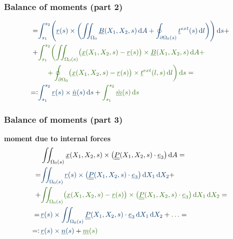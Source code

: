 \begin{frame}
  \frametitle{Balance of moments (part 2)}
  \begin{displaymath}
    \begin{alignedat}{1}
      = &{\color{faublue} \int_{s_1}^{s_2} \Biggl( \underline{r}(s) \times \biggl( \iint_{\Omega_0} \underline{B}(X_1,X_2,s) \dif A + \oint_{\partial \Omega_{0}(s)} \underline{t}^{ext}(s) \dif l \biggr) \Biggr) \dif s} + \\
        + &{\color{og_dark_green} \int_{s_1}^{s_2} \biggl( \iint_{\Omega_{0}(s)} \bigl( \underline{x}(X_1,X_2,s) - \underline{r}(s) \bigr) \times \underline{B}(X_1,X_2,s) \dif A + } \\
        &{\color{og_dark_green} \quad \: \, + \oint_{\partial \Omega_0} \bigl( \underline{x}(X_1,X_2,s) - \underline{r}(s) \bigr) \times \underline{t}^{ext}(l,s) \dif l \biggr) \dif s } = \\
      =: &{\color{faublue} \int_{s_1}^{s_2} \underline{r}(s) \times \underline{\hat{n}}(s) \dif s} +
        {\color{og_dark_green} \int_{s_1}^{s_2} \underline{\hat{m}}(s) \dif s}
    \end{alignedat}
  \end{displaymath}
\end{frame}


\begin{frame}
  \frametitle{Balance of moments (part 3)}
  \textbf{moment due to internal forces}
  \begin{displaymath}
    \begin{alignedat}{1}
      &\iint_{\Omega_0(s)} \underline{x}(X_1,X_2,s) \times \bigl( \doubleunderline{P}(X_1,X_2,s) \cdot \underline{e}_3 \bigr) \dif A = \\
      =&{\color{faublue} \iint_{\Omega_0(s)} \underline{r}(s) \times \bigl( \doubleunderline{P}(X_1,X_2,s) \cdot \underline{e}_3 \bigr) \dif X_1 \dif X_2} + \\
      + &{\color{og_dark_green} \iint_{\Omega_0(s)} \bigl( \underline{x}(X_1,X_2,s) - \underline{r}(s) \bigr) \times \bigl( \doubleunderline{P}(X_1,X_2,s) \cdot \underline{e}_3 \bigr) \dif X_1 \dif X_2} = \\
      = \, &{\color{faublue} \underline{r}(s) \times \iint_{\Omega_0(s)} \doubleunderline{P}(X_1,X_2,s) \cdot \underline{e}_3 \dif X_1 \dif X_2} + {\color{og_dark_green} \dots} = \\
      =: \, &{\color{faublue} \underline{r}(s) \times \underline{n}(s)} +
        {\color{og_dark_green} \underline{m}(s)}
    \end{alignedat}
  \end{displaymath}
\end{frame}


